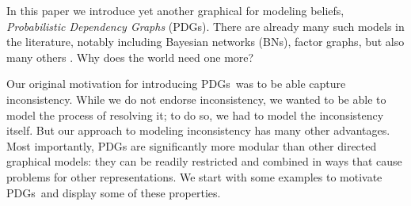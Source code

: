 \documentclass{article}
\newcommand{\MN}{PDG}
\newcommand{\MNs}{\MN s}
\numberwithin{equation}{section}
\begin{document}
In this paper we introduce yet another graphical for modeling beliefs, \emph{Probabilistic Dependency Graphs} (PDGs). There are already many such models in the literature, notably including Bayesian networks (BNs), factor graphs, but also many others \parencite[For an overview, see][]{koller2009probabilistic}. Why does the world need one more?

Our original motivation for introducing \MNs\ was to be able capture inconsistency. While we do not endorse inconsistency, we wanted to be able to model the process of resolving it; to do so, we had to model the inconsistency itself. But our approach to modeling inconsistency has many other advantages.
Most importantly, \MN s are significantly more modular than other directed graphical models: they can be readily restricted and combined in ways that cause problems for other representations. 
We start with some examples to motivate \MNs\ and display some of these properties.
\end{document}
